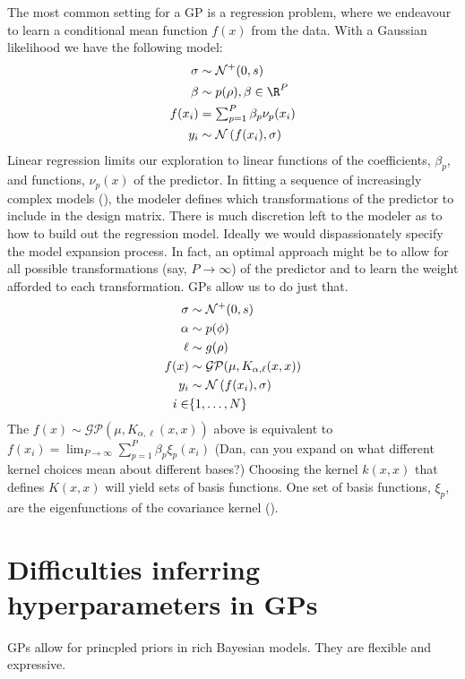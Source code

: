 \documentclass{article}
\newcommand{\lp}{\ensuremath{\left(}}
\newcommand{\rp}{\ensuremath{\right)}}
\begin{document}
The most common setting for a GP is a regression problem, where we endeavour to
learn a conditional mean function $f(x)$ from the data. With a Gaussian
likelihood we have the following model:
%
\begin{align*}
  \sigma & \sim \mathcal{N}^+(0, s) \\
  \beta & \sim p(\rho), \beta \in \R^P \\
  f(x_i) & = \textstyle \sum_{p=1}^P \beta_p \nu_p(x_i) \\
  y_i & \sim \mathcal{N}\lp f(x_i),
  \sigma\rp 
\end{align*}
%
Linear regression limits our exploration to linear functions of the
coefficients, $\beta_p$, and functions, $\nu_p(x)$ of the predictor. In fitting
a sequence of increasingly complex models (\citet{gelman2014bayesian}), the
modeler defines which transformations of the predictor to include in the design
matrix. There is much discretion left to the modeler as to how to build out the
regression model. Ideally we would dispassionately specify the model expansion
process. In fact, an optimal approach might be to allow for all possible
transformations (say, $P \rightarrow \infty$) of the predictor and to learn the
weight afforded to each transformation. GPs allow us to do just that.
%
\begin{align*}
  \sigma & \sim \mathcal{N}^+(0, s) \\
  \alpha & \sim p(\phi) \\
  \ell & \sim g(\rho) \\
  f(x) & \sim \mathcal{GP}(\mu, K_{\alpha, \ell}(x, x)) \\
  y_i & \sim \mathcal{N}\lp f(x_i),
  \sigma\rp  \\
  i \in & \{1, \dots, N\}
\end{align*}
%
The $f(x) \sim \mathcal{GP}(\mu, K_{\alpha, \ell}(x, x))$ above is equivalent to
$f(x_i)  = \textstyle \lim_{P \to \infty} \sum_{p=1}^P \beta_p \xi_p(x_i)$
(Dan, can you expand on what different kernel choices mean about different bases?)
Choosing the kernel $k(x, x)$ that defines $K(x, x)$ will yield sets of 
basis functions. One set of basis functions, $\xi_p$, are the eigenfunctions 
of the covariance kernel (\citet{rasmussen2005gaussian}).

\section{Difficulties inferring hyperparameters in GPs}

GPs allow for princpled priors in rich Bayesian models. They are flexible and
expressive. 
\end{document}
